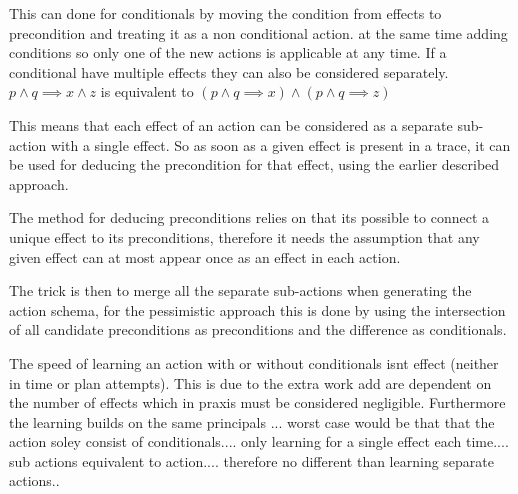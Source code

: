 	This can done for conditionals by moving the condition from effects to precondition and treating it as a non conditional action. at the same time adding conditions so only one of the new actions is applicable at any time. If a conditional have multiple effects they can also be considered separately.
	$p \land q \implies x \land z$
	is equivalent to 
	$(p \land q \implies x)
	\land
	(p \land q \implies z)$
	
	
	This means that each effect of an action can be considered as a separate sub-action with a single effect. So as soon as a given effect is present in a trace, it can be used for deducing the precondition for that effect, using the earlier described approach. 
	
	The method for deducing preconditions relies on that its possible to connect a unique effect to its preconditions, therefore it needs the assumption that any given effect can at most appear once as an effect in each action.
	
	The trick is then to merge all the separate sub-actions when generating the action schema, for the pessimistic approach this is done by using the intersection of all candidate preconditions as preconditions and the difference as conditionals.
	
	
	The speed of learning an action with or without conditionals isnt effect (neither in time or plan attempts). This is due to the extra work add are dependent on the number of effects which in praxis must be considered negligible. Furthermore the learning builds on the same principals ...  worst case would be that that the action soley consist of conditionals.... only learning for a single effect each time.... sub actions equivalent to action.... therefore no different than learning separate actions.. 
	


